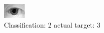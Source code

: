 \begin{figure}[h!]
\begin{center}
\includegraphics[width=0.60\columnwidth]{figures/ID1189_class_2_target_3.png}
\end{center}
\caption{ Classification: 2 actual target: 3}
\label{fig:ID1189_class_2_target_3}
\end{figure}
